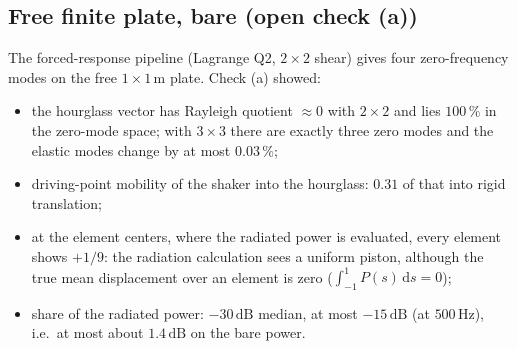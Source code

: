 \documentclass[11pt]{article}
\begin{document}
\subsection{Free finite plate, bare (open check (a))}
The forced-response pipeline (Lagrange Q2, $2\times 2$ shear) gives four
zero-frequency modes on the free $1 \times 1\,\mathrm{m}$ plate. Check (a) showed:
\begin{itemize}
  \item the hourglass vector has Rayleigh quotient $\approx 0$ with $2\times 2$ and lies
        $100\,\%$ in the zero-mode space; with $3\times 3$ there are exactly three zero
        modes and the elastic modes change by at most $0.03\,\%$;
  \item driving-point mobility of the shaker into the hourglass: $0.31$ of that into
        rigid translation;
  \item at the element centers, where the radiated power is evaluated, every element
        shows $+1/9$: the radiation calculation sees a uniform piston, although the
        true mean displacement over an element is zero
        ($\int_{-1}^{1} P(s)\,\mathrm{d}s = 0$);
  \item share of the radiated power: $-30\,\mathrm{dB}$ median, at most
        $-15\,\mathrm{dB}$ (at $500\,\mathrm{Hz}$), i.e.\ at most about
        $1.4\,\mathrm{dB}$ on the bare power.
\end{itemize}
\end{document}
